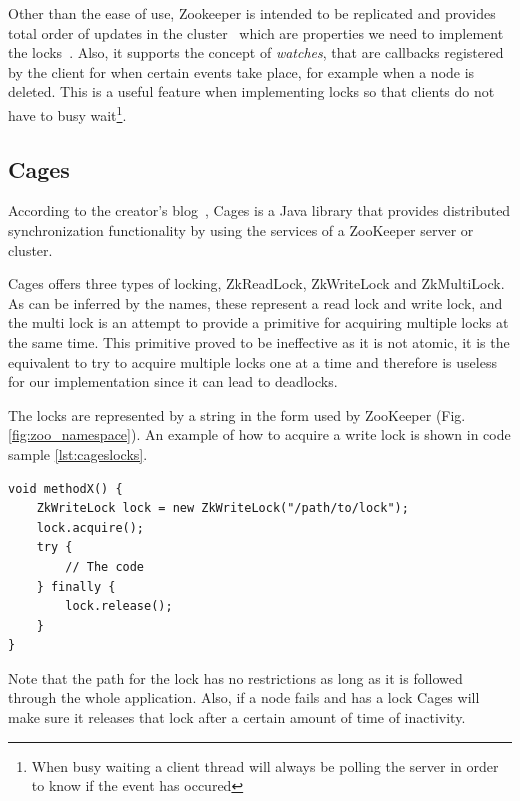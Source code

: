 Other than the ease of use, Zookeeper is intended to be replicated and provides total order of updates in the cluster~\cite{zooDoc} which are properties we need to implement the locks~\cite{zooLocks}. Also, it supports the concept of \emph{watches}, that are callbacks registered by the client for when certain events take place, for example when a node is deleted. This is a useful feature when implementing locks so that clients do not have to busy wait\footnote{When busy waiting a client thread will always be polling the server in order to know if the event has occured}.

\subsection{Cages}
\label{sec:cages}
According to the creator's blog~\cite{cages}, Cages is a Java library that provides distributed synchronization functionality by using the services of a ZooKeeper server or cluster. 

Cages offers three types of locking, ZkReadLock, ZkWriteLock and ZkMultiLock. As can be inferred by the names, these represent a read lock and write lock, and the multi lock is an attempt to provide a primitive for acquiring multiple locks at the same time. This primitive proved to be ineffective as it is not atomic, it is the equivalent to try to acquire multiple locks one at a time and therefore is useless for our implementation since it can lead to deadlocks.

The locks are represented by a string in the form used by ZooKeeper (Fig. \ref{fig:zoo_namespace}). An example of how to acquire a write lock is shown in code sample \ref{lst:cageslocks}.
 
\lstset{
  language=Java, 
  caption=Acquiring a lock with Cages, 
  label=lst:cageslocks,
}


\begin{shaded}
\begin{lstlisting}
void methodX() {
    ZkWriteLock lock = new ZkWriteLock("/path/to/lock");
    lock.acquire();
    try {
        // The code
    } finally {
        lock.release();
    }
}
\end{lstlisting}  
\end{shaded} 

Note that the path for the lock has no restrictions as long as it is followed through the whole application. Also, if a node fails and has a lock Cages will make sure it releases that lock after a certain amount of time of inactivity.

